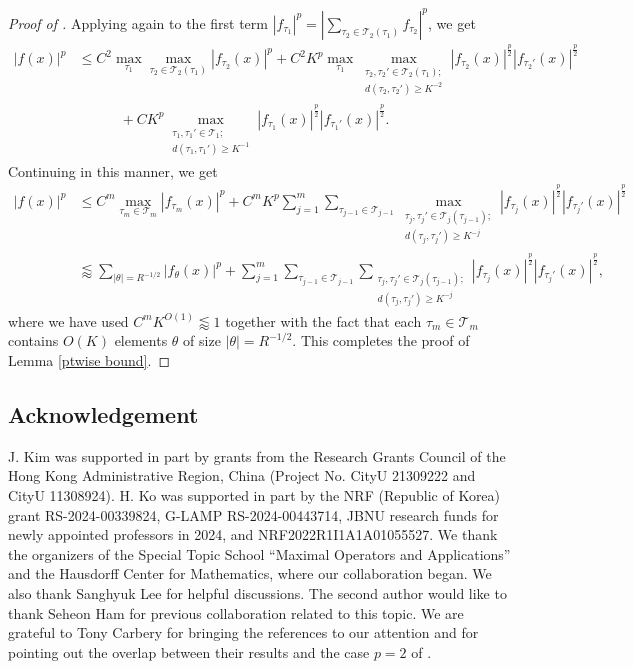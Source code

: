 \documentclass[11pt]{amsart}
\theoremstyle{definition}
\theoremstyle{remark}
\newcommand{\less}{\lessapprox}
\begin{document}
\begin{proof}[Proof of ]
Applying  again to the first term $|f_{\tau_1}|^p=|\sum_{\tau_2 \in \mathcal T_2(\tau_1)}f_{\tau_2}|^p$, we get 
\begin{align*}
  |f(x)|^p &\leq C^2 \max_{\tau_1} \max_{\tau_2\in \mathcal T_2(\tau_1)} |f_{\tau_2}(x)|^p + C^2K^p \max_{\tau_1} \max_{\substack{\tau_2,\tau_2' \in \mathcal T_2(\tau_1);\\ d(\tau_2,\tau_2')\ge K^{-2} }} |f_{\tau_2}(x)|^{\frac p2} |f_{\tau_2'}(x)|^{\frac p2} \\ &\qquad \quad+  CK^p \max_{\substack{\tau_1,\tau_1' \in \mathcal T_1;\\ d(\tau_1,\tau_1')\ge K^{-1} }} |f_{\tau_1}(x)|^{\frac p2} |f_{\tau_1'}(x)|^{\frac p2}.
\end{align*}
Continuing in this manner,  we get 
\begin{equation*}
	\begin{split}
  |f(x)|^p &\leq C^m \max_{\tau_m\in \mathcal{T}_m} |f_{\tau_m}(x)|^p + C^mK^p \sum_{j=1}^m \sum_{\tau_{j-1} \in \mathcal T_{j-1}} \max_{\substack{\tau_j,\tau_j' \in \mathcal T_j(\tau_{j-1});\\ d(\tau_j,\tau_j')\ge K^{-j} }} |f_{\tau_j}(x)|^{\frac p2} |f_{\tau_j'}(x)|^{\frac p2} \\
   &\less \sum_{|\theta|=R^{-1/2}} |f_{\theta}(x)|^{p} +  \sum_{j=1}^m \sum_{\tau_{j-1} \in \mathcal T_{j-1}} \sum_{\substack{\tau_j,\tau_j' \in \mathcal T_j(\tau_{j-1});\\ d(\tau_j,\tau_j')\ge K^{-j}  }} |f_{\tau_j}(x)|^{\frac p2} |f_{\tau_j'}(x)|^{\frac p2},
\end{split}
\end{equation*}
where we have used $C^m K^{O(1)} \less 1$ together with the fact that each $\tau_m \in \mathcal{T}_m$ contains $O(K)$ elements $\theta$ of size $|\theta| = R^{-1/2}$.
This completes the proof of Lemma \ref{ptwise bound}.
\end{proof}

\subsection*{Acknowledgement} 

J. Kim  was supported in part by grants from the Research Grants Council of the Hong Kong Administrative Region, China (Project No. CityU 21309222 and CityU 11308924). H. Ko was supported in part by the NRF (Republic of Korea) grant RS-2024-00339824, G-LAMP RS-2024-00443714,  JBNU research funds for newly appointed professors in 2024, and NRF2022R1I1A1A01055527. 
We thank the organizers of the Special Topic School “Maximal Operators and Applications” and the Hausdorff Center for Mathematics, where our collaboration began.
We also thank Sanghyuk Lee  for helpful discussions. The second author would like to thank Seheon Ham  for previous collaboration related to this topic. 
We are grateful to Tony Carbery for bringing the references \cite{CarberySeeger, CarberySlide} to our attention and for pointing out the overlap between their results and the case $p=2$ of .
\end{document}
